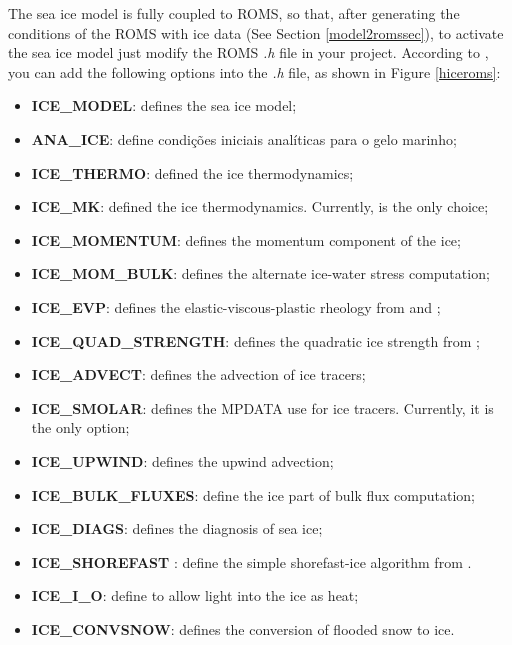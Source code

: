\noindent The sea ice model is fully coupled to ROMS, so that, after generating the conditions of the
ROMS with ice data (See Section \textcolor{bleu_cite}{\ref{model2romssec}}), to activate the sea ice model 
just modify the ROMS \textit{.h} file in your project. According to \textcite{hedstrom2018}, you can
add the following options into the \textit{.h} file, as shown in Figure \textcolor{bleu_cite}{\ref{hiceroms}}:
\bigskip

\begin{itemize}
    \item \textbf{ICE\_MODEL}: defines the sea ice model;
    \item \textbf{ANA\_ICE}: define condições iniciais analíticas para o gelo marinho;
    \item \textbf{ICE\_THERMO}: defined the ice thermodynamics;
    \item \textbf{ICE\_MK}: defined the \textcite{Mellor1989} ice thermodynamics. Currently, is the only choice;
    \item \textbf{ICE\_MOMENTUM}: defines the momentum component of the ice;
    \item \textbf{ICE\_MOM\_BULK}: defines the alternate ice-water stress computation;
    \item \textbf{ICE\_EVP}: defines the elastic-viscous-plastic rheology from \textcite{Hunke1997} and \textcite{Hunke2001};
    \item \textbf{ICE\_QUAD\_STRENGTH}: defines the quadratic ice strength from \textcite{Overland1988};
    \item \textbf{ICE\_ADVECT}: defines the advection of ice tracers;
    \item \textbf{ICE\_SMOLAR}: defines the MPDATA use for ice tracers. Currently, it is the only option;
    \item \textbf{ICE\_UPWIND}: defines the upwind advection;
    \item \textbf{ICE\_BULK\_FLUXES}: define the ice part of bulk flux computation;
    \item \textbf{ICE\_DIAGS}: defines the diagnosis of sea ice;
    \item \textbf{ICE\_SHOREFAST} : define the simple shorefast-ice algorithm from \textcite{Budgell2005}.
    \item \textbf{ICE\_I\_O}: define to allow light into the ice as heat;
    \item \textbf{ICE\_CONVSNOW}: defines the conversion of flooded snow to ice.
\end{itemize}
\bigskip


